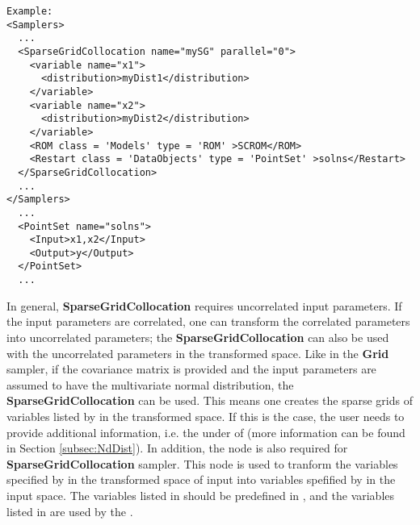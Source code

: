 
\footnotesize
\begin{lstlisting}[style=XML]
Example:
<Samplers>
  ...
  <SparseGridCollocation name="mySG" parallel="0">
    <variable name="x1">
      <distribution>myDist1</distribution>
    </variable>
    <variable name="x2">
      <distribution>myDist2</distribution>
    </variable>
    <ROM class = 'Models' type = 'ROM' >SCROM</ROM>
    <Restart class = 'DataObjects' type = 'PointSet' >solns</Restart>
  </SparseGridCollocation>
  ...
</Samplers>
  ...
  <PointSet name="solns">
    <Input>x1,x2</Input>
    <Output>y</Output>
  </PointSet>
  ...
\end{lstlisting}
 \normalsize

In general, \textbf{SparseGridCollocation} requires uncorrelated input parameters. If the input parameters are correlated, one can transform the
correlated parameters into uncorrelated parameters; the \textbf{SparseGridCollocation} can also be used with the uncorrelated parameters
in the transformed space. Like in the \textbf{Grid} sampler, if the covariance matrix is provided
and the input parameters are assumed to have the multivariate normal distribution, the \textbf{SparseGridCollocation} can be used.
This means one creates the sparse grids of variables listed by  in the transformed space. If this is
the case, the user needs to provide additional information, i.e. the  under 
of  (more information can be found in Section \ref{subsec:NdDist}). In addition, the node
 is also required for \textbf{SparseGridCollocation} sampler. This node is used to tranform
the variables specified by  in the transformed space of input into variables spefified by
 in the input space. The variables listed in  should be predefined
in , and the variables listed in 
are used by the .



